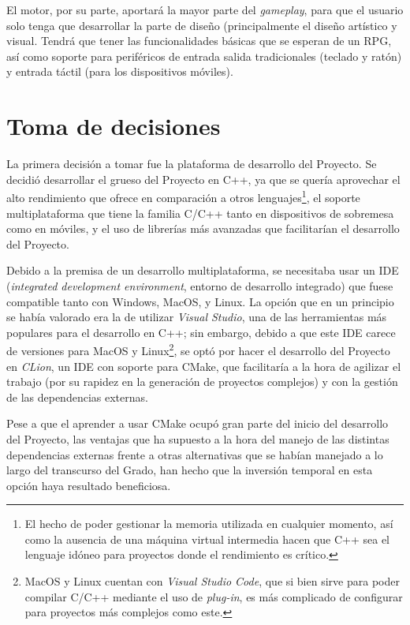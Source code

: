 \medskip

El motor, por su parte, aportará la mayor parte del \textit{gameplay}, para que el usuario solo tenga que desarrollar la parte de diseño (principalmente el diseño artístico y visual. Tendrá que tener las funcionalidades básicas que se esperan de un RPG, así como soporte para periféricos de entrada salida tradicionales (teclado y ratón) y entrada táctil (para los dispositivos móviles). 

\section{Toma de decisiones}
\label{sec:decisiones}
La primera decisión a tomar fue la plataforma de desarrollo del Proyecto. Se decidió desarrollar el grueso del Proyecto en C++, ya que se quería aprovechar el alto rendimiento que ofrece en comparación a otros lenguajes\footnote{El hecho de poder gestionar la memoria utilizada en cualquier momento, así como la ausencia de una máquina virtual intermedia hacen que C++ sea el lenguaje idóneo para proyectos donde el rendimiento es crítico.}, el soporte multiplataforma que tiene la familia C/C++ tanto en dispositivos de sobremesa como en móviles, y el uso de librerías más avanzadas que facilitarían el desarrollo del Proyecto.

\medskip

Debido a la premisa de un desarrollo multiplataforma, se necesitaba usar un IDE (\textit{integrated development environment}, entorno de desarrollo integrado) que fuese compatible tanto con Windows, MacOS, y Linux. La opción que en un principio se había valorado era la de utilizar \textit{Visual Studio}, una de las herramientas más populares para el desarrollo en C++; sin embargo, debido a que este IDE carece de versiones para MacOS y Linux\footnote{MacOS y Linux cuentan con \textit{Visual Studio Code}, que si bien sirve para poder compilar C/C++ mediante el uso de \textit{plug-in}, es más complicado de configurar para proyectos más complejos como este.}, se optó por hacer el desarrollo del Proyecto en \textit{CLion}, un IDE con soporte para CMake, que facilitaría a la hora de agilizar el trabajo (por su rapidez en la generación de proyectos complejos) y con la gestión de las dependencias externas.

\smallskip

Pese a que el aprender a usar CMake ocupó gran parte del inicio del desarrollo del Proyecto, las ventajas que ha supuesto a la hora del manejo de las distintas dependencias externas frente a otras alternativas que se habían manejado a lo largo del transcurso del Grado, han hecho que la inversión temporal en esta opción haya resultado beneficiosa.

